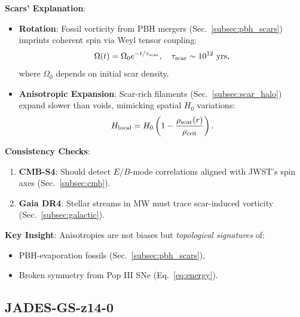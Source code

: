 \documentclass{article}
\begin{document}
\textbf{Scars' Explanation}:  
\begin{itemize}  
    \item \textbf{Rotation}: Fossil vorticity from PBH mergers (Sec.~\ref{subsec:pbh_scars}) imprints coherent spin via Weyl tensor coupling:  
    \begin{equation}  
        \Omega(t) = \Omega_0 e^{-t/\tau_{\rm scar}}, \quad \tau_{\rm scar} \sim 10^{12}~\text{yrs},  
        \label{eq:universal_rotation}  
    \end{equation}  
    where $\Omega_0$ depends on initial scar density.  

    \item \textbf{Anisotropic Expansion}: Scar-rich filaments (Sec.~\ref{subsec:scar_halo}) expand slower than voids, mimicking spatial $H_0$ variations:  
    \begin{equation}  
        H_{\rm local} = H_0 \left(1 - \frac{\rho_{\rm scar}(r)}{\rho_{\rm crit}}\right).  
        \label{eq:anisotropic_hubble}  
    \end{equation}  
\end{itemize}  

\textbf{Consistency Checks}:  
\begin{enumerate}  
    \item \textbf{CMB-S4}: Should detect $E/B$-mode correlations aligned with JWST's spin axes (Sec.~\ref{subsec:cmb}).  
    \item \textbf{Gaia DR4}: Stellar streams in MW must trace scar-induced vorticity (Sec.~\ref{subsec:galactic}).  
\end{enumerate}  

\textbf{Key Insight}:  
Anisotropies are not biases but \textit{topological signatures} of:  
\begin{itemize}  
    \item PBH-evaporation fossils (Sec.~\ref{subsec:pbh_scars}),  
    \item Broken symmetry from Pop III SNe (Eq.~\ref{eq:energy}).  
\end{itemize} 

\subsection{JADES-GS-z14-0}
\label{subsec:Jades}
\end{document}
